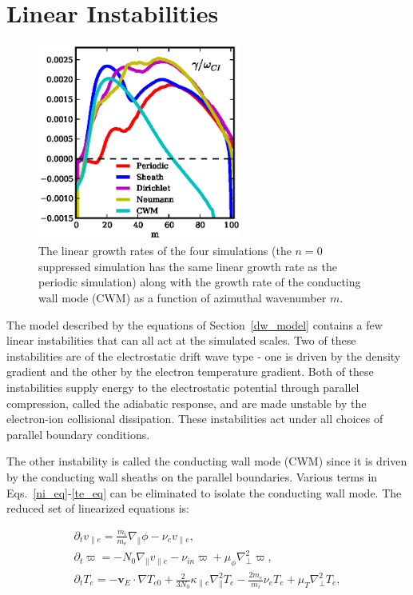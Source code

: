 \documentclass[showpacs,preprintnumbers,amsmath,amssymb,superscriptaddress,aip]{revtex4-1}
\def\beqar{\begin{eqnarray}}
\def\eeqar{\end{eqnarray}}
\newcommand{\pdt}{\partial_t}
\def\grad{\nabla}
\newcommand{\gradpar}{\grad_\parallel}
\newcommand{\gradperp}{\grad_\perp}
\newcommand{\vpe}{v_{\parallel e}}
\newcommand{\nue}{\nu_{e}}
\newcommand{\nuin}{\nu_{in}}
\newcommand{\kpe}{\kappa_{\parallel e}}
\newcommand{\fmie}{\frac{m_i}{m_e}}
\begin{document}
\section{Linear Instabilities}
\label{sec_linear}

\begin{figure}[!htbp]
\includegraphics[width=0.6\textwidth]{gamma_comparisons}
\hfil
\caption{The linear growth rates of the four simulations (the $n=0$ suppressed simulation has the same linear growth rate as the periodic simulation) along with the growth rate of 
the conducting wall mode (CWM) as a function of azimuthal wavenumber $m$.}
\label{drift_cwm_gamma}
\end{figure}


The model described by the equations of Section~\ref{dw_model} contains a few linear instabilities that can all act at the simulated scales. Two of these instabilities are of the electrostatic
drift wave type - one is driven by the density gradient and the other by the electron temperature gradient. Both of these instabilities supply energy to the electrostatic potential through parallel
compression, called the adiabatic response, and are made unstable by the electron-ion collisional dissipation. These instabilities act under all choices of parallel boundary conditions.

The other instability is called the conducting wall mode (CWM) since it is driven by the conducting wall sheaths on the parallel boundaries. Various terms in Eqs.~\ref{ni_eq}-\ref{te_eq} 
can be eliminated to isolate the conducting wall mode. The reduced set of linearized equations is:

\beqar
\label{ve_eq2}
\pdt \vpe = \fmie \gradpar \phi - \nue \vpe, \\
\label{rho_eq2}
\pdt \varpi = - N_0 \gradpar \vpe - \nuin \varpi + \mu_\phi \gradperp^2 \varpi, \\
\label{te_eq2}
\pdt T_e = - {\mathbf v_E} \cdot \grad T_{e0} + \frac{2}{3 N_0} \kpe \gradpar^2 T_e  - \frac{2 m_e}{m_i} \nue T_e  + \mu_T \gradperp^2 T_e,
\eeqar
\end{document}
